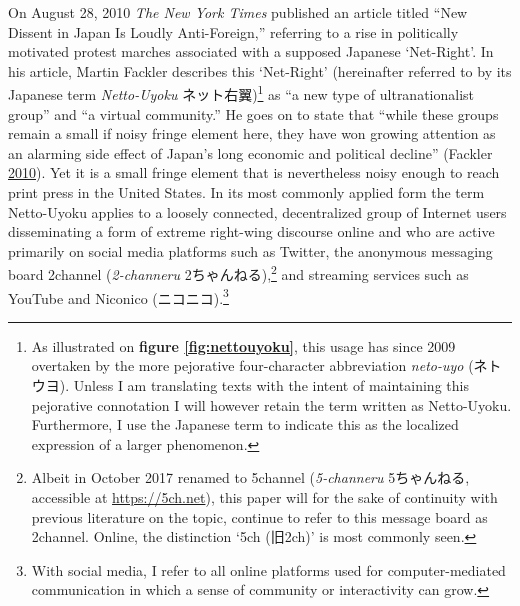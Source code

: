 \documentclass[10pt,british,A4paper,,openany]{memoir}
\begin{document}
\pagestyle{plain}


On August 28, 2010 \emph{The New York Times} published an article titled
``New Dissent in Japan Is Loudly Anti-Foreign,'' referring to a rise in
politically motivated protest marches associated with a supposed
Japanese `Net-Right'. In his article, Martin Fackler describes this
`Net-Right' (hereinafter referred to by its Japanese term
\emph{Netto-Uyoku} ネット右翼)\footnote{As illustrated on \textbf{figure
  \ref{fig:nettouyoku}}, this usage has since 2009 overtaken by the more
  pejorative four-character abbreviation \emph{neto-uyo} (ネトウヨ).
  Unless I am translating texts with the intent of maintaining this
  pejorative connotation I will however retain the term written as
  Netto-Uyoku. Furthermore, I use the Japanese term to indicate this as
  the localized expression of a larger phenomenon.} as ``a new type of
ultranationalist group'' and ``a virtual community.'' He goes on to
state that ``while these groups remain a small if noisy fringe element
here, they have won growing attention as an alarming side effect of
Japan's long economic and political decline'' (Fackler
\protect\hyperlink{ref-fackler_new_2010-1}{2010}). Yet it is a small
fringe element that is nevertheless noisy enough to reach print press in
the United States. In its most commonly applied form the term
Netto-Uyoku applies to a loosely connected, decentralized group of
Internet users disseminating a form of extreme right-wing discourse
online and who are active primarily on social media platforms such as
Twitter, the anonymous messaging board 2channel (\emph{2-channeru}
2ちゃんねる),\footnote{Albeit in October 2017 renamed to 5channel
  (\emph{5-channeru} 5ちゃんねる, accessible at \url{https://5ch.net}),
  this paper will for the sake of continuity with previous literature on
  the topic, continue to refer to this message board as 2channel.
  Online, the distinction `5ch (旧2ch)' is most commonly seen.} and
streaming services such as YouTube and Niconico (ニコニコ).\footnote{With
  social media, I refer to all online platforms used for
  computer-mediated communication in which a sense of community or
  interactivity can grow.}
\end{document}
